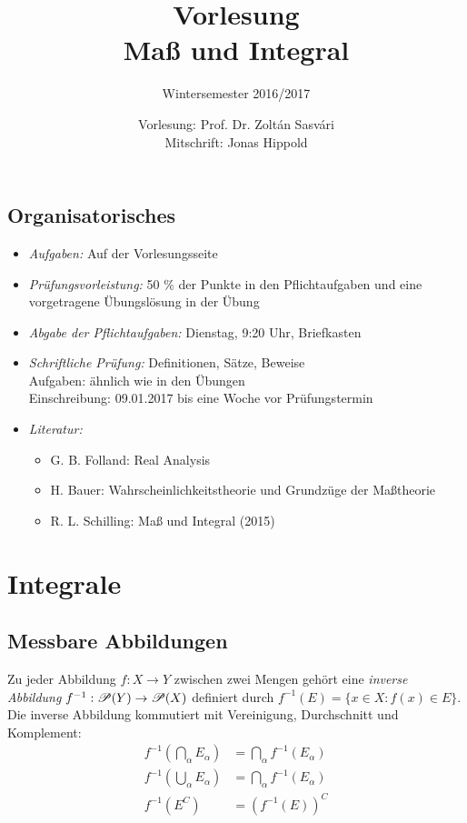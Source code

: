 \documentclass[
 a4paper,
 12pt,
 parskip=half
 ]{scrreprt}
\title{Vorlesung\\Maß und Integral}
\subtitle{Wintersemester 2016/2017}
\author{Vorlesung: Prof. Dr. Zoltán Sasvári\\Mitschrift: Jonas Hippold}
\theoremstyle{plain}
\theoremstyle{definition}
\numberwithin{equation}{section}
\begin{document}
\maketitle

\tableofcontents

\clearpage

\section*{Organisatorisches}
 \begin{itemize}
  \item \emph{Aufgaben:} Auf der Vorlesungsseite
  \item \emph{Prüfungsvorleistung:} 50 \% der Punkte in den Pflichtaufgaben und eine vorgetragene Übungslösung in der Übung
  \item \emph{Abgabe der Pflichtaufgaben:} Dienstag, 9:20 Uhr, Briefkasten 
  \item \emph{Schriftliche Prüfung:} Definitionen, Sätze, Beweise \\
   Aufgaben: ähnlich wie in den Übungen \\
   Einschreibung: 09.01.2017 bis eine Woche vor Prüfungstermin
  \item \emph{Literatur:}
   \begin{itemize}
    \item G. B. Folland: Real Analysis
    \item H. Bauer: Wahrscheinlichkeitstheorie und Grundzüge der Maßtheorie
    \item R. L. Schilling: Maß und Integral (2015)
   \end{itemize}
 \end{itemize}



\clearpage

\chapter{Integrale}
\section{Messbare Abbildungen}
Zu jeder Abbildung $f:X \to Y$ zwischen zwei Mengen gehört eine \emph{inverse Abbildung} $f^{-1}:\mathscr{P}(Y) \to \mathscr{P}(X)$ definiert durch $f^{-1}(E) = \{ x \in X : f(x) \in E \}.$ Die inverse Abbildung kommutiert mit Vereinigung, Durchschnitt und Komplement:
\begin{equation}
 \begin{aligned}
 f^{-1} \left( \bigcap_\alpha E_\alpha \right) &= \bigcap_\alpha f^{-1}(E_\alpha) \\
 f^{-1} \left( \bigcup_\alpha E_\alpha \right) &= \bigcap_\alpha f^{-1}(E_\alpha) \\
 f^{-1} ( E^C ) &= (f^{-1}(E) )^C
 \end{aligned}
 \tag{$\ast$}
\end{equation}
\end{document}

